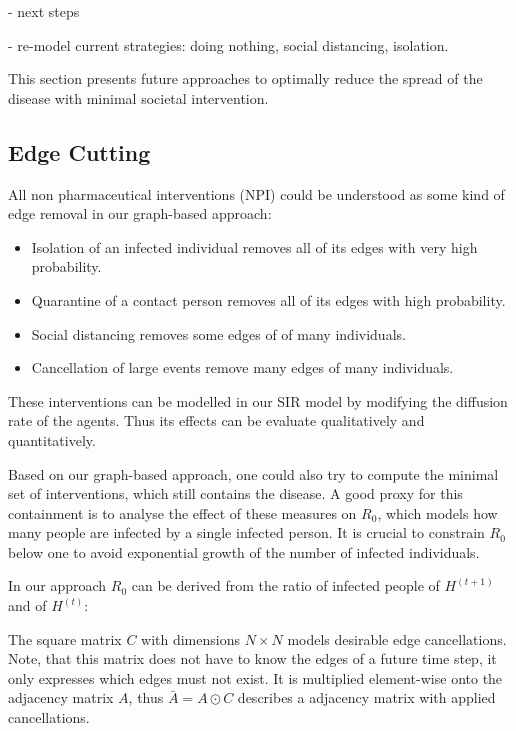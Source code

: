 - next steps

- re-model current strategies: doing nothing, social distancing, isolation.

This section presents future approaches to optimally reduce the spread of the disease with minimal societal intervention.

\subsection{Edge Cutting}
All non pharmaceutical interventions (NPI) could be understood as some kind of edge removal in our graph-based approach:
\begin{itemize}
	\item Isolation of an infected individual removes all of its edges with very high probability.
	\item Quarantine of a contact person removes all of its edges with high probability.
	\item Social distancing removes some edges of of many individuals.
	\item Cancellation of large events remove many edges of many individuals.
\end{itemize}
These interventions can be modelled in our SIR model by modifying the diffusion rate of the agents.
Thus its effects can be evaluate qualitatively and quantitatively.

Based on our graph-based approach, one could also try to compute the minimal set of interventions, which still contains the disease.
A good proxy for this containment is to analyse the effect of these measures on $R_0$, which models how many people are infected by a single infected person.
It is crucial to constrain $R_0$ below one to avoid exponential growth of the number of infected individuals.

In our approach $R_0$ can be derived from the ratio of infected people of $H^{(t+1)}$ and of $H^{(t)}$:
\begin{equation}
\end{equation}

The square matrix $C$ with dimensions $N \times N$ models desirable edge cancellations.
Note, that this matrix does not have to know the edges of a future time step, it only expresses which edges must not exist.
It is multiplied element-wise onto the adjacency matrix $A$, thus $\bar{A} = A \odot C$ describes a adjacency matrix with applied cancellations.

